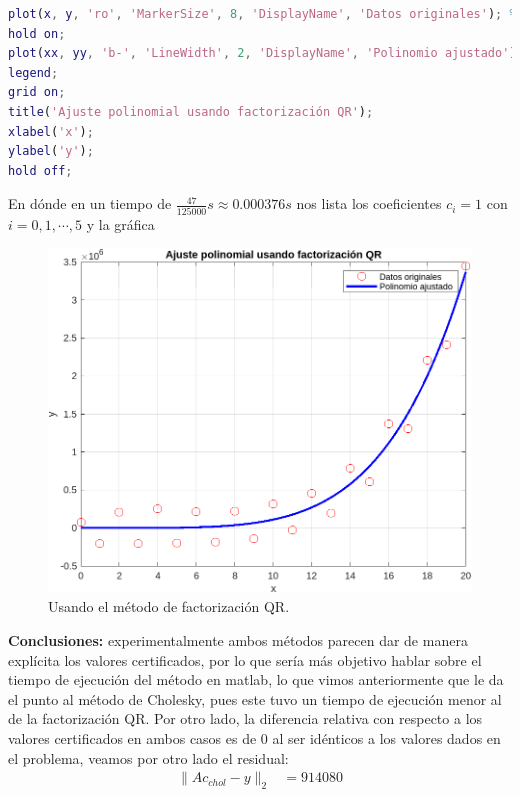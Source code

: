 \begin{homeworkProblem}
\begin{solucion}
\begin{enumerate}
\begin{lstlisting}[language = matlab]
plot(x, y, 'ro', 'MarkerSize', 8, 'DisplayName', 'Datos originales'); % Puntos originales
hold on;
plot(xx, yy, 'b-', 'LineWidth', 2, 'DisplayName', 'Polinomio ajustado'); % Polinomio
legend;
grid on;
title('Ajuste polinomial usando factorización QR');
xlabel('x');
ylabel('y');
hold off;
        \end{lstlisting}
        En dónde en un tiempo de $\frac{47}{125000}s\approx 0.000376 s$ nos lista los coeficientes $c_i=1$ con $i=0,1,\cdots,5$ y la gráfica 
        \begin{figure}[H]
          \begin{center}
            \includegraphics[scale=0.7]{Figures/qrpunto2.png}
          \end{center}
          \caption{Usando el método de factorización QR.}
        \end{figure} 
    \end{enumerate}
    \textbf{Conclusiones:} experimentalmente ambos métodos parecen dar de manera explícita los valores certificados, por lo que sería más objetivo hablar sobre el tiempo de ejecución del método en matlab, lo que vimos anteriormente que le da el punto al método de Cholesky, pues este tuvo un tiempo de ejecución menor al de la factorización QR. Por otro lado, la diferencia relativa con respecto a los valores certificados en ambos casos es de $0$ al ser idénticos a los valores dados en el problema, veamos por otro lado el residual:
    \begin{align*}
      \|Ac_{chol}-y\|_{2}&=914080\\

\end{align*}
\end{solucion}
\end{homeworkProblem}
